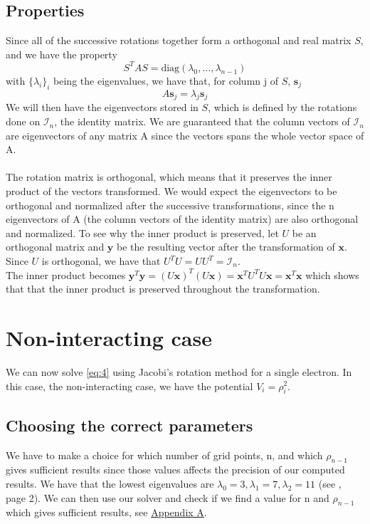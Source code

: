 \documentclass[12pt]{article}
\begin{document}
	 \subsection{Properties} \label{sub:1}
	 Since all of the successive rotations together form a orthogonal and real matrix $S$, and we have the property
	 $$
	 S^TAS= \text{diag}(\lambda_0,\dots,\lambda_{n-1})
	 $$
	 with $\{\lambda_i\}_i$  being the eigenvalues, we have that, for column j of $S$, $\mathbf{s}_j$
	 $$
	 A\mathbf{s}_j = \lambda_j\mathbf{s}_j
	 $$
	 We will then have the eigenvectors stored in $S$, which is defined by the rotations done on $\mathcal{I}_n$, the identity matrix. We are guaranteed that the column vectors of $\mathcal{I}_n$ are eigenvectors of any matrix A since the vectors spans the whole vector space of A. \\ \\
	 The rotation matrix is orthogonal, which means that it preserves the inner product of the vectors transformed. 
	  We would expect the eigenvectors to be orthogonal and normalized after the successive transformations, since the n eigenvectors of A (the column vectors of the identity matrix) are also orthogonal and normalized. To see why the inner product is preserved, let $U$ be an orthogonal matrix and $\mathbf{y}$ be the resulting vector after the transformation of $\mathbf{x}$. Since $U$ is orthogonal, we have that $U^TU = UU^T = \mathcal{I}_n$. \\ The inner product becomes $\mathbf{y} ^T\mathbf{y} = ( U\mathbf{x} )^T( U\mathbf{x} ) =  \mathbf{x}^TU^T U\mathbf{x}  = \mathbf{x}^T\mathbf{x}$ which shows that that the inner product is preserved throughout the transformation. 
	 \section{Non-interacting case}
	 We can now solve \ref{eq:4} using Jacobi's rotation method for a single electron. In this case, the non-interacting case, we have the potential $V_i= \rho_i^2$.
	 \subsection{Choosing the correct parameters}
	 We have to make a choice for which number of grid points, n, and which $\rho_{n-1}$ gives sufficient results since those values affects the precision of our computed results. 
	 We have that the lowest eigenvalues are $\lambda_0=3, \lambda_1 = 7, \lambda_2 = 11 $ (see \cite{projectDesc}, page 2). We can then use our solver and check if we find a value for n and $\rho_{n-1}$ which gives sufficient results, see \hyperref[app:1]{Appendix A}. 
\end{document}

